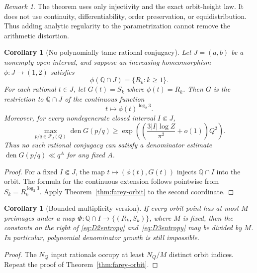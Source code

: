 \documentclass[11pt]{article}
\newtheorem{corollary}[theorem]{Corollary}
\theoremstyle{definition}
\theoremstyle{remark}
\newtheorem{remark}[theorem]{Remark}
\newcommand{\Q}{\mathbb Q}
\newcommand{\den}{\operatorname{den}}
\begin{document}
\begin{remark}
The theorem uses only injectivity and the exact orbit-height law.  It does not use
continuity, differentiability, order preservation, or equidistribution.  Thus adding
analytic regularity to the parametrization cannot remove the arithmetic distortion.
\end{remark}

\begin{corollary}[No polynomially tame rational conjugacy]\label{cor:no-tame-conjugacy}
Let $J=(a,b)$ be a nonempty open interval, and suppose an increasing homeomorphism
$\phi:J\to(1,2)$ satisfies
\[
 \phi(\Q\cap J)=\{R_k:k\ge1\}.
\]
For each rational $t\in J$, let $G(t)=S_k$ where $\phi(t)=R_k$.  Then $G$ is the
restriction to $\Q\cap J$ of the continuous function
\[
 t\longmapsto \phi(t)^{\log_2 3}.
\]
Moreover, for every nondegenerate closed interval $I\Subset J$,
\begin{equation}
 \max_{p/q\in\mathcal F_I(Q)}\den G(p/q)
 \ge \exp\!\left(\left(\frac{3|I|\log Z}{\pi^2}+o(1)\right)Q^2\right).
 \label{eq:conjugacy-distortion}
\end{equation}
Thus no such rational conjugacy can satisfy a denominator estimate
$\den G(p/q)\ll q^A$ for any fixed $A$.
\end{corollary}

\begin{proof}
For a fixed $I\Subset J$, the map $t\mapsto(\phi(t),G(t))$ injects $\Q\cap I$ into the
orbit.  The formula for the continuous extension follows pointwise from
$S_k=R_k^{\log_2 3}$.  Apply Theorem~\ref{thm:farey-orbit} to the second coordinate.
\end{proof}

\begin{corollary}[Bounded multiplicity version]\label{cor:bounded-multiplicity}
If every orbit point has at most $M$ preimages under a map
$\Phi:\Q\cap I\to\{(R_k,S_k)\}$, where $M$ is fixed, then the constants on the right of
\eqref{eq:D2entropy} and~\eqref{eq:D3entropy} may be divided by $M$.
In particular, polynomial denominator growth is still impossible.
\end{corollary}

\begin{proof}
The $N_Q$ input rationals occupy at least $N_Q/M$ distinct orbit indices.  Repeat the proof of
Theorem~\ref{thm:farey-orbit}.
\end{proof}
\end{document}
